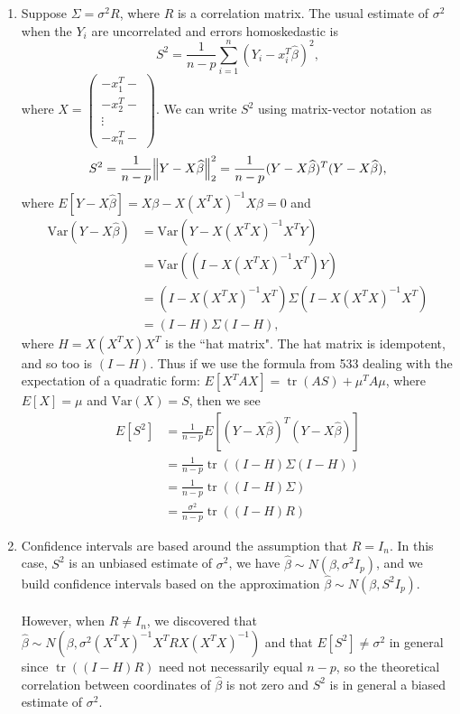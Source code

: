 \documentclass[11pt]{article}
\newcommand{\Var}{\mathrm{Var}}
\newcommand{\tr}{\operatorname{tr}}
\begin{document}
\begin{enumerate}
\begin{enumerate}
			\item Suppose $\Sigma = \sigma^2R$, where $R$ is a correlation matrix. The usual estimate of $\sigma^2$ when the $Y_i$ are uncorrelated and errors homoskedastic is
			\[
				S^2 = \frac{1}{n-p}\sum_{i=1}^n (Y_i - x_i^T\widehat{\beta})^2,
			\]
			where $X = \begin{pmatrix}
			-x_1^T- \\ -x_2^T- \\ \vdots \\ -x_n^T-
			\end{pmatrix}$. We can write $S^2$ using matrix-vector notation as
			\[
				S^2 = \frac{1}{n-p} \norm{Y-X\widehat{\beta}}_2^2 = \frac{1}{n-p}(Y-X\widehat{\beta})^T(Y-X\widehat{\beta}),
			\]
			where $E[Y-X\widehat{\beta}] = X\beta - X(X^TX)^{-1}X\beta = 0$ and 
			\begin{align*}
				\Var(Y-X\widehat{\beta}) &= \Var(Y-X(X^TX)^{-1}X^TY) \\
				&= \Var((I-X(X^TX)^{-1}X^T)Y) \\
				&= (I-X(X^TX)^{-1}X^T)\Sigma(I-X(X^TX)^{-1}X^T) \\
				&= (I-H)\Sigma(I-H),
			\end{align*}
			where $H=X(X^TX)X^T$ is the ``hat matrix". The hat matrix is idempotent, and so too is $(I-H)$. Thus if we use the formula from 533 dealing with the expectation of a quadratic form: $E[X^TAX] = \tr(AS) + \mu^TA\mu$, where $E[X] = \mu$ and $\Var(X) = S$, then we see
			\begin{align*}
				E[S^2] &= \frac{1}{n-p}E[(Y-X\widehat{\beta})^T(Y-X\widehat{\beta})] \\
				&= \frac{1}{n-p} \tr((I-H)\Sigma(I-H)) \\
				&= \frac{1}{n-p} \tr((I-H)\Sigma) \\
				&= \frac{\sigma^2}{n-p}\tr((I-H)R)
			\end{align*}
			\item Confidence intervals are based around the assumption that $R=I_n$. In this case, $S^2$ is an unbiased estimate of $\sigma^2$, we have $\widehat{\beta}\sim N(\beta,\sigma^2I_p)$, and we build confidence intervals based on the approximation $\widehat{\beta}\sim N(\beta,S^2I_p)$.\\ \\
			However, when $R\neq I_n$, we discovered that $\widehat{\beta} \sim N(\beta, \sigma^2(X^TX)^{-1}X^TR X(X^TX)^{-1})$ and that $E[S^2]\neq \sigma^2$ in general since $\tr((I-H)R)$ need not necessarily equal $n-p$, so the theoretical correlation between coordinates of $\widehat{\beta}$ is not zero and $S^2$ is in general a biased estimate of $\sigma^2$.

\end{enumerate}
\end{enumerate}
\end{document}
